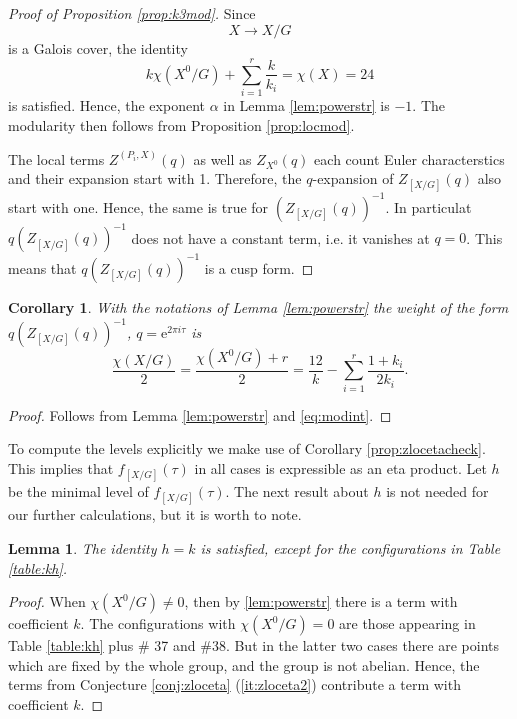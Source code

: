 \documentclass[11pt,a4paper]{amsart}
\newtheorem{lemma}[theorem]{Lemma}
\newtheorem{corollary}[theorem]{Corollary}
\theoremstyle{definition}
\begin{document}
\begin{proof}[{Proof of Proposition \ref{prop:k3mod}}] %
Since 
\[ X \to X/G \]
is a Galois cover, the identity
\begin{equation} k\chi(X^0/G)+\sum_{i=1}^r \frac{k}{k_i}=\chi(X)=24 
\label{eq:modint}
\end{equation}
is satisfied. Hence, the exponent $\alpha$ in Lemma \ref{lem:powerstr} is $-1$. The modularity then follows from Proposition \ref{prop:locmod}.

The local terms $Z^{(P_i, X)}(q)$ as well as $Z_{X^0}(q)$ each count Euler characterstics and their expansion start with 1. Therefore, the $q$-expansion of $Z_{[X/G]}(q)$ also start with one. Hence, the same is true for $(Z_{[X/G]}(q))^{-1}$. In particulat $q(Z_{[X/G]}(q))^{-1}$ does not have a constant term, i.e. it vanishes at $q=0$. This means that $q(Z_{[X/G]}(q))^{-1}$ is a cusp form.
\end{proof}

\begin{corollary}
With the notations of Lemma \ref{lem:powerstr} the weight of the form $q(Z_{[X/G]}(q))^{-1}$, $q=\mathrm{e}^{2 \pi i \tau}$ is
\begin{equation} \label{eq:weight} \frac{\chi(X/G)}{2}=\frac{\chi(X^0/G)+r}{2}=\frac{12}{k}-\sum_{i=1}^r \frac{1+k_i}{2k_i}. \end{equation}
\end{corollary}
\begin{proof}
Follows from Lemma \ref{lem:powerstr} and \eqref{eq:modint}.
\end{proof}

To compute the levels explicitly we make use of Corollary \ref{prop:zlocetacheck}. This implies that $f_{[X/G]}(\tau)$ in all cases is expressible as an eta product. Let $h$ be the minimal level of $f_{[X/G]}(\tau)$. The next result about $h$ is not needed for our further calculations, but it is worth to note.
\begin{lemma}
The identity $h=k$ is satisfied, except for the configurations in Table \ref{table:kh}. 
\end{lemma}
\begin{proof}
	When $\chi(X^0/G)\neq 0$, then by \ref{lem:powerstr} there is a term with coefficient $k$. The configurations with $\chi(X^0/G)=0$ are those appearing in Table \ref{table:kh} plus \# 37 and \#38. But in the latter two cases there are points which are fixed by the whole group, and the group is not abelian. Hence, the terms from Conjecture \ref{conj:zloceta} (\ref{it:zloceta2}) contribute a term with coefficient $k$.
\end{proof}
\end{document}
